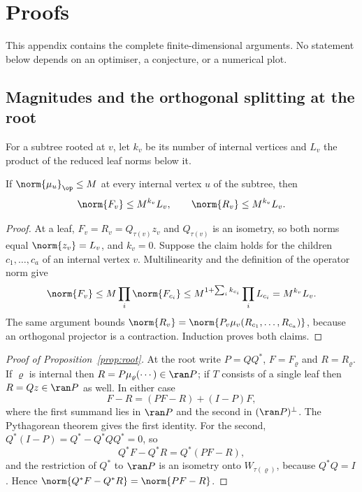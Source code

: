 \section{Proofs}
\label{app:proofs}

This appendix contains the complete finite-dimensional arguments. No statement below
depends on an optimiser, a conjecture, or a numerical plot.

\subsection{Magnitudes and the orthogonal splitting at the root}

For a subtree rooted at $v$, let $k_v$ be its number of internal vertices and $L_v$ the
product of the reduced leaf norms below it.

\begin{lemma}
\label{lem:magnitudes}
If $\norm{\mu_u}_\op\le M$ at every internal vertex $u$ of the subtree, then
\[
 \norm{F_v}\le M^{k_v}L_v,
 \qquad
 \norm{R_v}\le M^{k_v}L_v.
\]
\end{lemma}

\begin{proof}
At a leaf, $F_v=R_v=Q_{\tau(v)}z_v$ and $Q_{\tau(v)}$ is an isometry, so both norms equal
$\norm{z_v}=L_v$, and $k_v=0$. Suppose the claim holds for the children
$c_1,\ldots,c_a$ of an internal vertex $v$. Multilinearity and the definition of the
operator norm give
\[
 \norm{F_v}
 \le M\prod_i\norm{F_{c_i}}
 \le M^{1+\sum_ik_{c_i}}\prod_iL_{c_i}
 =M^{k_v}L_v.
\]
The same argument bounds $\norm{R_v}=\norm{P_v\mu_v(R_{c_1},\ldots,R_{c_a})}$, because an
orthogonal projector is a contraction. Induction proves both claims.
\end{proof}

\begin{proof}[Proof of Proposition~\ref{prop:root}]
At the root write $P=QQ^*$, $F=F_\varrho$ and $R=R_\varrho$. If $\varrho$ is internal then
$R=P\mu_\varrho(\cdots)\in\ran P$; if $T$ consists of a single leaf then $R=Qz\in\ran P$
as well. In either case
\[
 F-R=(PF-R)+(I-P)F,
\]
where the first summand lies in $\ran P$ and the second in $(\ran P)^\perp$. The
Pythagorean theorem gives the first identity. For the second, $Q^*(I-P)=Q^*-Q^*QQ^*=0$,
so
\[
 Q^*F-Q^*R=Q^*(PF-R),
\]
and the restriction of $Q^*$ to $\ran P$ is an isometry onto $W_{\tau(\varrho)}$, because
$Q^*Q=I$. Hence $\norm{Q^*F-Q^*R}=\norm{PF-R}$.
\end{proof}

